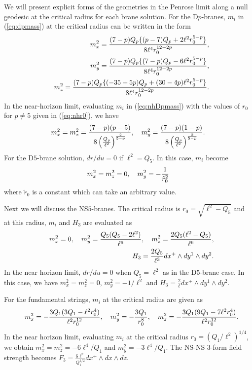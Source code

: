 \documentclass[a4paper,12pt]{article}
\begin{document}
We will present explicit forms of the geometries
in the Penrose limit along a null geodesic at
the critical radius for each brane solution.
For the D$p$-branes, $m_i$ in (\ref{eq:dpmass}) 
at the critical radius can be written in the form
\begin{eqnarray}
&& m_{x}^{2}= {(7-p)Q_{p}\{ (p-7)Q_{p}+2\ell^2 r_{0}^{5-p}\} \over 
8\ell^4 r_{0}^{12-2p} },\nonumber\\
&& m_{y}^{2}= {(7-p)Q_{p}\{ (7-p)Q_{p}-6\ell^2 r_{0}^{5-p}\} \over 
8\ell^4 r_{0}^{12-2p} }, \nonumber\\
&& m_{z}^2={(7-p)Q_{p} \{ (-35+5p)Q_{p}+(30-4p)\ell^2 r_{0}^{5-p} \}\over
 8\ell^4 r_{0}^{12-2p}}.
\end{eqnarray}
In the near-horizon limit, evaluating $m_i$ in 
(\ref{eq:nhDpmass}) with the values of 
$r_0$ for $p\neq 5$ given in (\ref{eq:nhr0}), 
we have
\begin{eqnarray}
 m_{x}^2= m_{z}^2= {(7-p)(p-5) \over 8 \left(Q_{p}\over\ell^2\right)
^{2\over 5-p}}, \quad
m_{y}^2= {(7-p)(1-p)\over 8 \left(Q_{p}\over\ell^2\right)
^{2\over 5-p}}.
\end{eqnarray}
For the D$5$-brane solution, $dr/du=0$ if $\ell^2=Q_{5}$.
In this case, $m_i$ become 
\begin{eqnarray}
 m_{x}^2= m_{z}^2=0, \quad
 m_{y}^2= -{1\over \tilde{r}_{0}^2}
\end{eqnarray}
where $\tilde{r}_{0}$ is a constant which can take
an arbitrary value.

Next we will discuss the NS$5$-branes.
The critical radius is 
$r_0=\sqrt{\ell^2-Q_{5}}$ and 
at this radius, $m_i$ and $H_3$ are evaluated as
\begin{eqnarray}
&&m_{x}^{2}=0, \quad
m_{y}^2= {Q_{5}(Q_{5}-2\ell^2)\over \ell^6},\quad
m_{z}^{2}= {2 Q_{5}(\ell^2-Q_{5})\over \ell^6},\nonumber \\
&&H_3=\frac{2Q_5}{\ell^3}dx^+\wedge dy^1\wedge dy^2.
\end{eqnarray}
In the near horizon limit, 
$dr/du=0$ when $Q_5=\ell^2$ as in the D$5$-brane case. 
In this case, we have $m_x^2=m_z^2=0$, $m_y^2=-1/\ell^2$
and $H_3=\frac{2}{\ell}dx^+\wedge dy^1\wedge dy^2$.

For the fundamental strings, $m_i$ at the critical
radius are given as  
\begin{eqnarray}
&& m_{x}^2= -{3 Q_{1}(3 Q_{1}-\ell^2 r_0^4)\over \ell^2 r_0^{12}},\quad
m_{y}^2= -{3 Q_{1}\over r_0^8},\quad
m_{z}^2= - {3Q_{1}(9Q_1-7\ell^2r_0^4)\over \ell^2r_0^{12}}.
\end{eqnarray}
In the near horizon limit, evaluating 
$m_i$ at the critical radius
$r_0=(Q_1/\ell^2)^{1/4}$, we obtain
$m_x^2=m_z^2=-6\ell^4/Q_1$ and $m_y^2=-3\ell^4/Q_1$.
The NS-NS $3$-form field strength becomes 
$F_3=\frac{6\ell^2}{Q_1^{1/2}}dx^+\wedge 
dx\wedge dz$.
\end{document}
